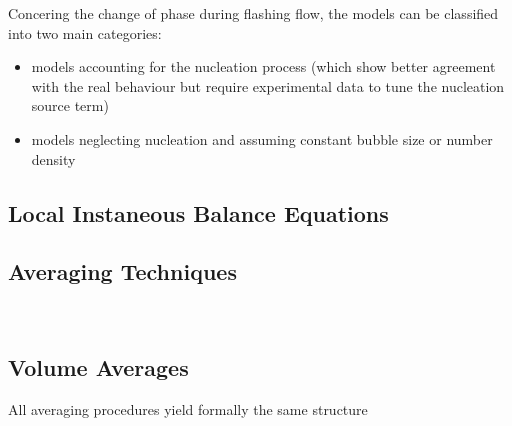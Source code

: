 Concering the change of phase during flashing flow, the models can be classified into two main categories:
\begin{itemize}
\item models accounting for the nucleation process (which show better agreement with the real behaviour but require experimental data to tune the nucleation source term)
\item models neglecting nucleation and assuming constant bubble size or number density
\end{itemize}

\subsection{Local Instaneous Balance Equations}
\subsection{Averaging Techniques}
~\cite{bloschVolumeAveragedMacroscopicTransport1997, tryggvasonDirectNumericalSimulations2011}~\cite{ghiaasiaanTwoPhaseFlowBoiling2007, wornerCompactIntroductionNumerical}
\subsection{Volume Averages}
All averaging procedures yield formally the same structure~\cite{tryggvasonDirectNumericalSimulations2011}
